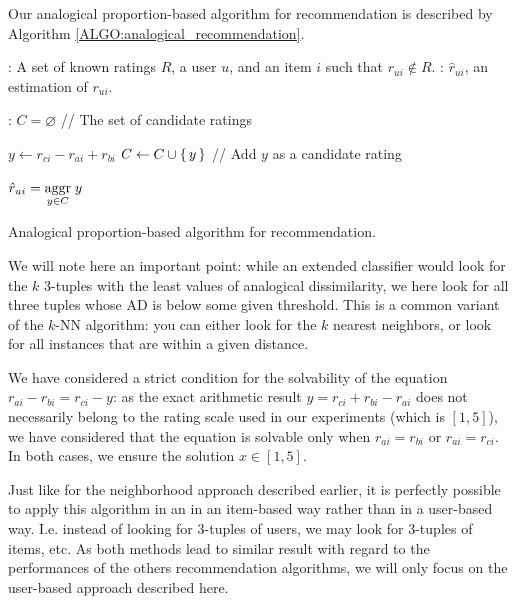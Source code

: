 Our analogical proportion-based algorithm for recommendation is described by
Algorithm \ref{ALGO:analogical_recommendation}.
 \begin{algorithm}[!ht]
       \begin{algorithmic}

      : A set of known ratings $R$, a user $u$, and an item
         $i$ such that $r_{ui} \notin R$.
      : $\hat{r}_{ui}$, an estimation of $r_{ui}$.

      :
      \STATE $C = \varnothing$ \quad \quad // The set of candidate ratings

      \STATE  $y \leftarrow r_{ci} - r_{ai} + r_{bi}$
      \STATE $C \gets C \cup \set{y}$ \quad // Add $y$ as a candidate rating
	  \ENDFOR

    \STATE $\hat{r}_{ui} = \underset{y \in C}{\operatorname{aggr}}\; y$

\end{algorithmic}
     \caption{Analogical proportion-based algorithm for recommendation.}
       \label{ALGO:analogical_recommendation}
\end{algorithm}

We will note here an important point: while an extended classifier would look
for the $k$ $3$-tuples with the least values of analogical dissimilarity, we
here look for all three tuples whose AD is below some given threshold. This is
a common variant of the $k$-NN algorithm: you can either look for the $k$
nearest neighbors, or look for all instances that are within a given distance.

We have considered a strict condition for the solvability of the equation
$r_{ai} - r_{bi} = r_{ci} - y$: as the exact arithmetic result $y=r_{ci} +
r_{bi} -r_{ai}$ does not necessarily belong to the rating scale used in our
experiments (which is $[1,5]$), we have
considered that the equation is solvable only when $r_{ai}=r_{bi}$ or
$r_{ai}=r_{ci}$. In both cases, we ensure the solution $x \in
[1,5]$.

Just like for the neighborhood approach described earlier, it is perfectly
possible to apply this algorithm in an in an item-based way rather
than in a user-based way. I.e. instead of looking for $3$-tuples of users, we
may look for $3$-tuples of items, etc. As both methods lead to similar result
with regard to the performances of the others recommendation algorithms, we
will only focus on the user-based approach described here.

